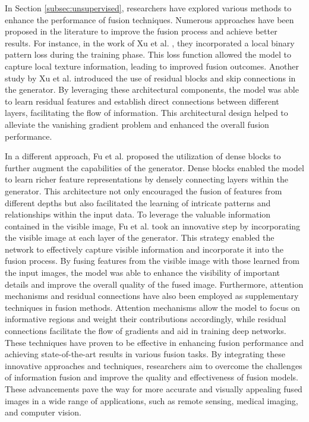 In Section \ref{subsec:unsupervised}, researchers have explored various methods to enhance the performance of fusion techniques. Numerous approaches have been proposed in the literature to improve the fusion process and achieve better results. For instance, in the work of Xu et al. \cite{xu2020lbp}, they incorporated a local binary pattern loss during the training phase. This loss function allowed the model to capture local texture information, leading to improved fusion outcomes. Another study by Xu et al. \cite{xu2020infrared} introduced the use of residual blocks and skip connections in the generator. By leveraging these architectural components, the model was able to learn residual features and establish direct connections between different layers, facilitating the flow of information. This architectural design helped to alleviate the vanishing gradient problem and enhanced the overall fusion performance.

In a different approach, Fu et al. \cite{fu2021image} proposed the utilization of dense blocks to further augment the capabilities of the generator. Dense blocks enabled the model to learn richer feature representations by densely connecting layers within the generator. This architecture not only encouraged the fusion of features from different depths but also facilitated the learning of intricate patterns and relationships within the input data. To leverage the valuable information contained in the visible image, Fu et al. \cite{fu2021image} took an innovative step by incorporating the visible image at each layer of the generator. This strategy enabled the network to effectively capture visible information and incorporate it into the fusion process. By fusing features from the visible image with those learned from the input images, the model was able to enhance the visibility of important details and improve the overall quality of the fused image. Furthermore, attention mechanisms \cite{wang2021new} and residual connections \cite{xu2020infrared} have also been employed as supplementary techniques in fusion methods. Attention mechanisms allow the model to focus on informative regions and weight their contributions accordingly, while residual connections facilitate the flow of gradients and aid in training deep networks. These techniques have proven to be effective in enhancing fusion performance and achieving state-of-the-art results in various fusion tasks. By integrating these innovative approaches and techniques, researchers aim to overcome the challenges of information fusion and improve the quality and effectiveness of fusion models. These advancements pave the way for more accurate and visually appealing fused images in a wide range of applications, such as remote sensing, medical imaging, and computer vision.

